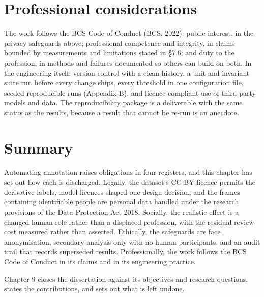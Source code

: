 \section{Professional considerations}

The work follows the BCS Code of Conduct (BCS, 2022): public interest, in the privacy safeguards above; professional competence and integrity, in claims bounded by measurements and limitations stated in \S{}7.6; and duty to the profession, in methods and failures documented so others can build on both. In the engineering itself: version control with a clean history, a unit-and-invariant suite run before every change ships, every threshold in one configuration file, seeded reproducible runs (Appendix B), and licence-compliant use of third-party models and data. The reproducibility package is a deliverable with the same status as the results, because a result that cannot be re-run is an anecdote.

\section{Summary}

Automating annotation raises obligations in four registers, and this chapter has set out how each is discharged. Legally, the dataset's CC-BY licence permits the derivative labels, model licences shaped one design decision, and the frames containing identifiable people are personal data handled under the research provisions of the Data Protection Act 2018. Socially, the realistic effect is a changed human role rather than a displaced profession, with the residual review cost measured rather than asserted. Ethically, the safeguards are face anonymisation, secondary analysis only with no human participants, and an audit trail that records superseded results. Professionally, the work follows the BCS Code of Conduct in its claims and in its engineering practice.

Chapter 9 closes the dissertation against its objectives and research questions, states the contributions, and sets out what is left undone.